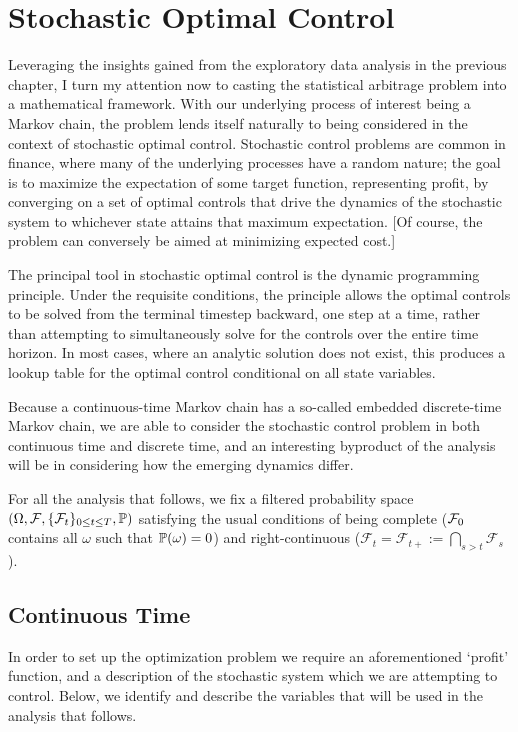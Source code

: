 \chapter{Stochastic Optimal Control}
Leveraging the insights gained from the exploratory data analysis in the previous chapter, I turn my attention now to casting the statistical arbitrage problem into a mathematical framework. With our underlying process of interest being a Markov chain, the problem lends itself naturally to being considered in the context of stochastic optimal control. Stochastic control problems are common in finance, where many of the underlying processes have a random nature; the goal is to maximize the expectation of some target function, representing profit, by converging on a set of optimal controls that drive the dynamics of the stochastic system to whichever state attains that maximum expectation. [Of course, the problem can conversely be aimed at minimizing expected cost.]

The principal tool in stochastic optimal control is the dynamic programming principle. Under the requisite conditions, the principle allows the optimal controls to be solved from the terminal timestep backward, one step at a time, rather than attempting to simultaneously solve for the controls over the entire time horizon. In most cases, where an analytic solution does not exist, this produces a lookup table for the optimal control conditional on all state variables. 

Because a continuous-time Markov chain has a so-called embedded discrete-time Markov chain, we are able to consider the stochastic control problem in both continuous time and discrete time, and an interesting byproduct of the analysis will be in considering how the emerging dynamics differ.

For all the analysis that follows, we fix a filtered probability space $( \Omega, \cF, \{ \cF_t \}_{0 \leq t \leq T}, \P )$ satisfying the usual conditions of being complete ($\cF_0$ contains all $\omega$ such that $\P(\omega) = 0$) and right-continuous ($\mathcal{F}_t = \mathcal{F}_{t+} := \bigcap_{s > t} \mathcal{F}_s$).

\section{Continuous Time}
In order to set up the optimization problem we require an aforementioned `profit' function, and a description of the stochastic system which we are attempting to control. Below, we identify and describe the variables that will be used in the analysis that follows.

